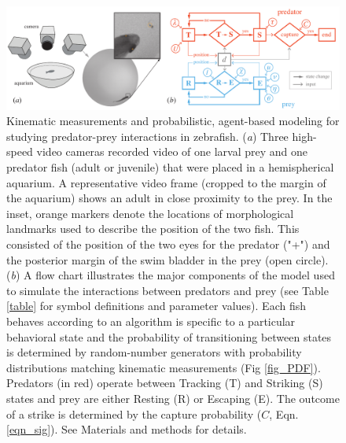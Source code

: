\documentclass[]{rsos}%
\begin{document}
\pagebreak

\linespread{1}\selectfont %


\begin{figure}[!h]
\centering
	\includegraphics[width=5.5in]{fig_setup}
\caption{
Kinematic measurements and probabilistic, agent-based modeling for studying predator-prey interactions in zebrafish. 
(\textit{a}) Three high-speed video cameras recorded video of one larval prey and one predator fish (adult or juvenile) that were placed in a hemispherical aquarium. 
A representative video frame (cropped to the margin of the aquarium) shows an adult in close proximity to the prey. 
In the inset, orange markers denote the locations of morphological landmarks used to describe the position of the two fish.
This consisted of the position of the two eyes for the predator ("+") and the posterior margin of the swim bladder in the prey (open circle). 
 (\textit{b}) A flow chart illustrates the major components of the model used to simulate the interactions between predators and prey (see Table \ref{table} for symbol definitions and parameter values). 
Each fish behaves according to an algorithm is specific to a particular behavioral state and the probability of transitioning between states is determined by random-number generators with probability distributions matching kinematic measurements (Fig \ref{fig_PDF}).
Predators (in red) operate between Tracking (T) and Striking (S) states and prey are either Resting (R) or Escaping (E).
The outcome of a strike is determined by the capture probability ($C$, Eqn. \ref{eqn_sig}). 
See Materials and methods for details.
 }
\label{fig_setup}
\end{figure}

\pagebreak
\end{document}
